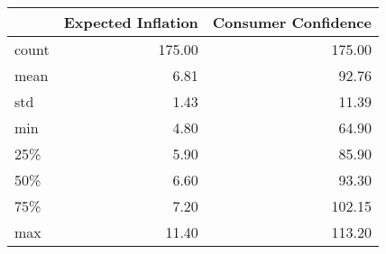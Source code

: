 \begin{tabular}{lrr}
\toprule
{} &  Expected Inflation &  Consumer Confidence \\
\midrule
count &              175.00 &               175.00 \\
mean  &                6.81 &                92.76 \\
std   &                1.43 &                11.39 \\
min   &                4.80 &                64.90 \\
25\%   &                5.90 &                85.90 \\
50\%   &                6.60 &                93.30 \\
75\%   &                7.20 &               102.15 \\
max   &               11.40 &               113.20 \\
\bottomrule
\end{tabular}
